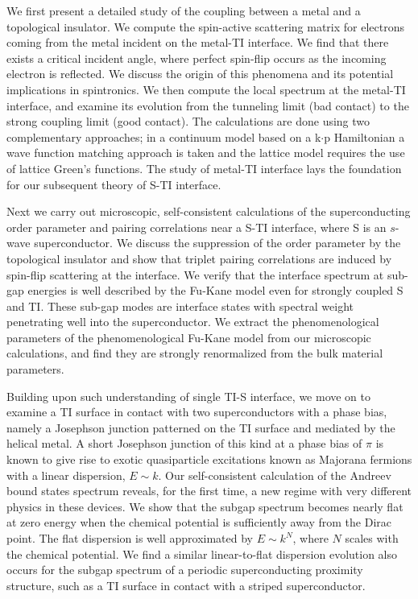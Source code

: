 \documentclass[11pt,letterpaper]{report}
\begin{document}
We first present a detailed study of the coupling between a metal and a topological insulator. We compute the spin-active scattering matrix for electrons coming from the metal incident on the metal-TI interface. We find that there exists a critical incident angle, where perfect spin-flip occurs as the incoming electron is reflected. We discuss the origin of this phenomena and its potential implications in spintronics. We then compute the local spectrum at the metal-TI interface, and examine its evolution from the tunneling limit (bad contact) to the strong coupling limit (good contact). The calculations are done using two complementary approaches; in a continuum model based on a k$\cdot$p Hamiltonian a wave function matching approach is taken and the lattice model requires the use of lattice Green's functions. The study of metal-TI interface lays the foundation for our subsequent theory of S-TI interface.

Next we carry out microscopic, self-consistent calculations of the superconducting order parameter and pairing correlations near a S-TI interface, where S is an $s$-wave superconductor. We discuss the suppression of the order parameter by the topological insulator and show that triplet pairing correlations are induced by spin-flip scattering at the interface. We verify that the interface spectrum at sub-gap energies is well described by the Fu-Kane model even for strongly coupled S and TI. These sub-gap modes are interface states with spectral weight penetrating well into the superconductor. We extract the phenomenological parameters of the phenomenological Fu-Kane model from our microscopic calculations, and find they are strongly renormalized from the bulk material parameters. 
\thispagestyle{empty}

Building upon such understanding of single TI-S interface, we move on to examine a TI surface in contact with two superconductors with a phase bias, namely a Josephson junction patterned on the TI surface and mediated by the helical metal. A short Josephson junction of this kind at a phase bias of $\pi$ is known to give rise to exotic quasiparticle excitations known as Majorana fermions with a linear dispersion, $E\sim k$. Our self-consistent calculation of the 
Andreev bound states spectrum reveals, for the first time, a new regime with very different physics in these devices. 
We show that the subgap spectrum becomes nearly flat at zero energy when the chemical potential is sufficiently away from the Dirac point. The flat dispersion is well approximated by $E\sim k^N$, where $N$ scales with the chemical potential. We find a similar linear-to-flat dispersion evolution also occurs for the subgap spectrum of a periodic superconducting proximity structure, such as a TI surface in contact with a striped superconductor.
\end{document}
